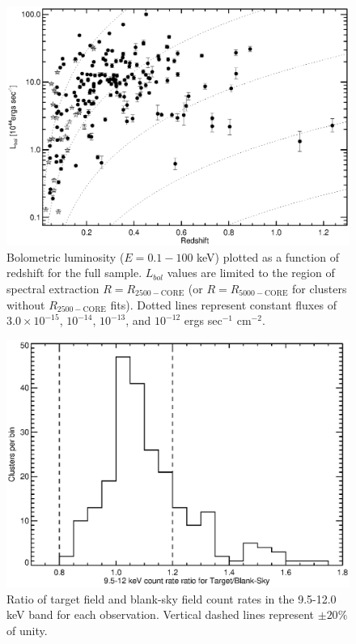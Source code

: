 \clearpage
\begin{figure}[htp]
\begin{center}
\includegraphics[scale=1.0]{lx_z}
\caption{\small
Bolometric luminosity ($E = 0.1-100$ keV) plotted as a function of
redshift for the full sample. $L_{bol}$ values are limited to the
region of spectral extraction $R=R_{2500-\mathrm{CORE}}$ (or
$R=R_{5000-\mathrm{CORE}}$ for clusters without $R_{2500-\mathrm{CORE}}$
fits). Dotted lines represent constant fluxes of $3.0\times10^{-15}$,
$10^{-14}$, $10^{-13}$, and $10^{-12}$ ergs sec$^{-1}$ cm$^{-2}$.
}
\label{fig:lx_z}
\end{center}
\end{figure}

\clearpage
\begin{figure}[htp]
\begin{center}
\includegraphics[scale=1.0]{bgd_fig}
\caption{\small
Ratio of target field and blank-sky field count rates in the 9.5-12.0
keV band for each observation. Vertical dashed lines represent $\pm
20\%$ of unity.
}
\label{fig:bgd}
\end{center}
\end{figure}

